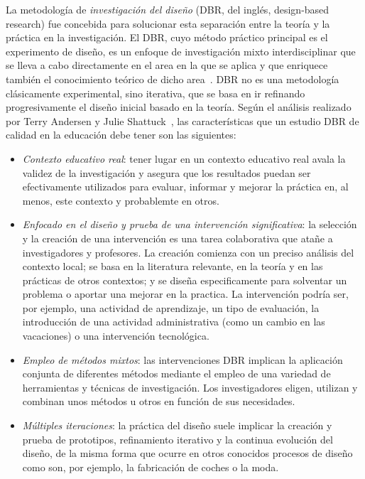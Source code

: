 La metodología de \emph{investigación del diseño} (DBR, del inglés, design-based research) fue concebida para solucionar esta separación entre la teoría y la práctica en la investigación. El DBR, cuyo método práctico principal es el experimento de diseño, es un enfoque de investigación mixto interdisciplinar que se lleva a cabo directamente en el area en la que se aplica y que enriquece también el conocimiento teórico de dicho area~\cite{reimann2011design}. DBR no es una metodología clásicamente experimental, sino iterativa, que se basa en ir refinando progresivamente el diseño inicial basado en la teoría. Según el análisis realizado por Terry Andersen y Julie Shattuck~\cite{anderson2012design}, las características que un estudio DBR de calidad en la educación debe tener son las siguientes:

\begin{itemize}
\item \emph{Contexto educativo real}: tener lugar en un contexto educativo real avala la validez de la investigación y asegura que los resultados puedan ser efectivamente utilizados para evaluar, informar y mejorar la práctica en, al menos, este contexto y probablemte en otros.
\item \emph{Enfocado en el diseño y prueba de una intervención significativa}: la selección y la creación de una intervención es una tarea colaborativa que atañe a investigadores y profesores. La creación comienza con un preciso análisis del contexto local; se basa en la literatura relevante, en la teoría y en las prácticas de otros contextos; y se diseña especificamente para solventar un problema o aportar una mejorar en la practica. La intervención podría ser, por ejemplo, una actividad de aprendizaje, un tipo de evaluación, la introducción de una actividad administrativa (como un cambio en las vacaciones) o una intervención tecnológica. %
\item \emph{Empleo de métodos mixtos}: las intervenciones DBR implican la aplicación conjunta de diferentes métodos mediante el empleo de una variedad de herramientas y técnicas de investigación. Los investigadores eligen, utilizan y combinan unos métodos u otros en función de sus necesidades.
\item \emph{Múltiples iteraciones}: la práctica del diseño suele implicar la creación y prueba de prototipos, refinamiento iterativo y la continua evolución del diseño, de la misma forma que ocurre en otros conocidos procesos de diseño como son, por ejemplo, la fabricación de coches o la moda.

\end{itemize}
